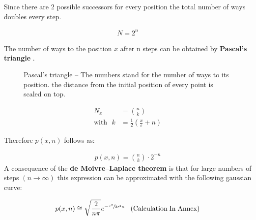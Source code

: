 \documentclass[a4paper, parskip=half]{scrartcl}
\newcommand{\effect}[1]{%
	\textbf{#1}%
}
\newcommand{\myEqLabel}[1]{\label{eq:#1}}
\newcommand{\myEqAnnex}[1]{\;\;\;\mathrm{(Calculation\;In\;Annex)} \myEqLabel{#1}}
\begin{document}
Since there are 2 possible successors for every position the total number of ways  doubles every step.

\begin{align}
N = 2^n
\end{align}

The number of ways to the position $x$ after n steps can be obtained by \effect{Pascal's triangle}.

\begin{figure}[H]
\centering
{}
\caption{Pascal's triangle -- The numbers stand for the number of ways to its position. the distance from the initial position of every point is scaled on top.}
\end{figure}

\begin{align}
N_x &= \binom{n}{k}\\
\mathrm{with} \, \, \,\, k &= \frac{1}{2}\left(\frac{x}{\varepsilon} + n \right)
\end{align}

Therefore $p(x,n)$ follows as:

\begin{align}
p(x,n) = \binom{n}{k} \cdot 2^{-n}
\end{align}
A consequence of the \effect{de Moivre–Laplace theorem} is that for large numbers of steps $(n\rightarrow\infty)$ this expression can be approximated with the following gaussian curve:

\begin{align}
p(x,n) \cong \sqrt{\frac{2}{n \pi}} e^{-\sfrac{x^2}{2\varepsilon^2 n}} \myEqAnnex{moivre_laplace_theorem}
\end{align}
\end{document}
